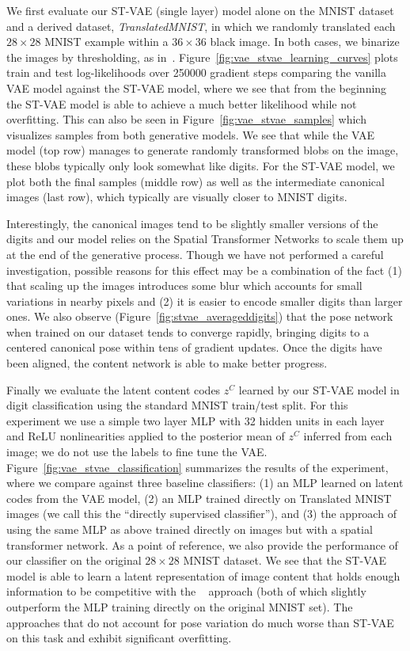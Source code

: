 We first evaluate our ST-VAE (single layer) model alone on the MNIST dataset~\citep{lecun1998gradient}
and a derived dataset, \emph{TranslatedMNIST}, in which we randomly translated each  $28\times 28$ MNIST example
within a $36\times 36$ black image.  In both cases, we binarize the
images by thresholding,
as in~\cite{Kingma2014}.
Figure~\ref{fig:vae_stvae_learning_curves} plots train and test log-likelihoods over 250000 gradient steps
comparing the vanilla VAE model against the ST-VAE model, where we see that from the beginning the ST-VAE
model is able to achieve a much better likelihood while not overfitting.  This can also be seen in Figure~\ref{fig:vae_stvae_samples}
which visualizes samples from both generative models.   We see that while the VAE model (top row) manages to 
generate randomly transformed blobs on the image, these blobs typically only look somewhat like digits. 
For the ST-VAE model, we plot both the final samples (middle row) as well as the intermediate canonical images (last row), 
which typically are visually closer to MNIST digits. 

Interestingly, the canonical images tend to be slightly smaller versions
of the digits and our model relies on the Spatial Transformer Networks to scale them up at the end of the generative process.
Though we have not performed a careful investigation, 
possible reasons for this effect may be a combination of the fact (1) that scaling up the images introduces some blur which accounts for small variations in  nearby pixels and (2) it  is easier to encode smaller digits than larger ones.
 We also observe (Figure~\ref{fig:stvae_averageddigits})
that the pose network when trained on our dataset tends to converge rapidly, bringing digits to a centered canonical pose
within tens of gradient updates. 
Once the digits have been aligned, the content network is able to make better progress.

Finally we evaluate the latent content codes $z^C$ learned by our ST-VAE model 
in digit classification using the standard MNIST train/test split.  For this experiment
we use a simple two layer MLP with 32 hidden units in each layer and
ReLU nonlinearities
applied to the posterior mean of $z^C$ inferred from each image; we
do not use the labels to fine tune the VAE.
Figure~\ref{fig:vae_stvae_classification} summarizes the results of the experiment, where we
compare against three baseline classifiers: (1) an MLP learned on latent codes from the VAE model,
(2) an MLP trained directly on Translated MNIST images (we call this the ``directly supervised classifier''), 
and (3) the approach of~\cite{jaderberg2015spatial} using the same MLP as above trained directly
on images but with a spatial transformer network.
As a point of reference, we also provide the performance of our classifier on the original $28\times 28$ MNIST
dataset.  We see that the ST-VAE model is able to learn a latent representation of image content that holds enough information
to be competitive with the ~\cite{jaderberg2015spatial} approach (both of which slightly outperform 
the MLP training directly on the original MNIST set).  The approaches that do not account for
pose variation do much worse than ST-VAE on this task and exhibit significant overfitting.

